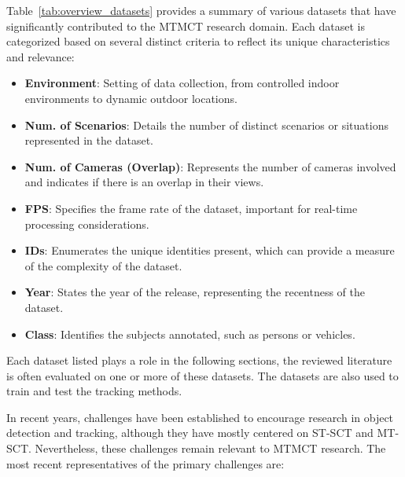
Table~\ref{tab:overview_datasets} provides a summary of various datasets that have significantly contributed to the MTMCT research domain. Each dataset is categorized based on several distinct criteria to reflect its unique characteristics and relevance:

\begin{itemize}
    \item \textbf{Environment}: Setting of data collection, from controlled indoor environments to dynamic outdoor locations.
    \item \textbf{Num. of Scenarios}: Details the number of distinct scenarios or situations represented in the dataset.
    \item \textbf{Num. of Cameras (Overlap)}: Represents the number of cameras involved and indicates if there is an overlap in their views.
    \item \textbf{FPS}: Specifies the frame rate of the dataset, important for real-time processing considerations.
    \item \textbf{IDs}: Enumerates the unique identities present, which can provide a measure of the complexity of the dataset.
    \item \textbf{Year}: States the year of the release, representing the recentness of the dataset.
    \item \textbf{Class}: Identifies the subjects annotated, such as persons or vehicles.
\end{itemize}

Each dataset listed plays a role in the following sections, the reviewed literature is often evaluated on one or more of these datasets. The datasets are also used to train and test the tracking methods.

In recent years, challenges have been established to encourage research in object detection and tracking, although they have mostly centered on ST-SCT and MT-SCT. Nevertheless, these challenges remain relevant to MTMCT research. The most recent representatives of the primary challenges are:

